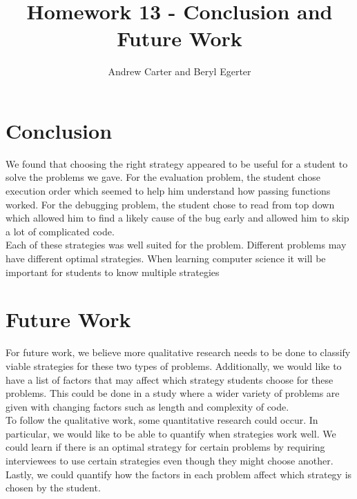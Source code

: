 \documentclass{article}
\title{Homework 13 - Conclusion and Future Work}
\author{Andrew Carter and Beryl Egerter}
\begin{document}
\maketitle
\section{Conclusion}

We found that choosing the right strategy appeared to be useful for a student to solve the problems we gave. 
For the evaluation problem, the student chose execution order which seemed to help him understand how passing functions worked. 
For the debugging problem, the student chose to read from top down which allowed him to find a likely cause of the bug early and allowed him to skip a lot of complicated code.  \\

Each of these strategies was well suited for the problem. 
Different problems may have different optimal strategies. 
When learning computer science it will be important for students to know multiple strategies 

\section{Future Work}



For future work, we believe more qualitative research needs to be done to classify viable strategies for these two types of problems. 
Additionally, we would like to have a list of factors that may affect which strategy students choose for these problems. 
This could be done in a study where a wider variety of problems are given with changing factors such as length and complexity of code. 
\\

To follow the qualitative work, some quantitative research could occur. 
In particular, we would like to be able to quantify when strategies work well. 
We could learn if there is an optimal strategy for certain problems by requiring interviewees to use certain strategies even though they might choose another. 
Lastly, we could quantify how the factors in each problem affect which strategy is chosen by the student. 
\end{document}
